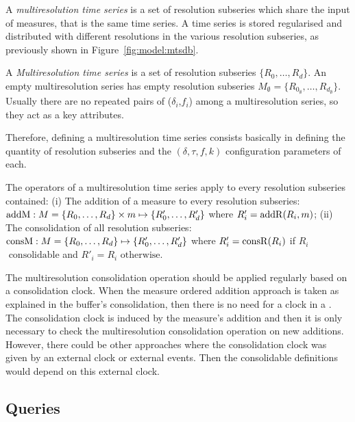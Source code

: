 A \emph{multiresolution time series} is a set of resolution subseries
which share the input of measures, that is the same time series. A
time series is stored regularised and distributed with different
resolutions in the various resolution subseries, as previously shown
in Figure~\ref{fig:model:mtsdb}.
\begin{definition}%
  A \emph{Mul\-ti\-re\-solution time series} is a set of resolution
  subseries $\{R_0, \dots, R_d\}$.  An empty multiresolution series
  has empty resolution subseries $M_{\emptyset}=\{R_{0_\emptyset},
  \dots, R_{d_\emptyset}\}$. Usually there are no repeated pairs of
  ($\delta_i$,$f_i$) among a multiresolution series, so they act as a
  key attributes.
\end{definition}

Therefore, defining a multiresolution time series consists basically
in defining the quantity of resolution subseries and the
$(\delta,\tau,f,k)$ configuration parameters of each.


The operators of a multiresolution time series apply to every
resolution subseries contained: (i) The addition of a measure to every
resolution subseries: $\operatorname{addM} : M=\{R_0,\allowbreak \dots,\allowbreak
R_d\} \times m \mapsto \{R'_0, \dots,\allowbreak R'_d\}$ where
$R'_i=\operatorname{addR}(R_i,m)$; (ii) The consolidation of all resolution
subseries: $\operatorname{consM} : M=\{R_0,\allowbreak \dots,\allowbreak R_d\}
\mapsto \{R'_0,\allowbreak \dots,\allowbreak R'_d\}$ where $R'_i =
\operatorname{consR}(R_i)$ if $R_i$ $\text{ consolidable}$ and $R'_i=R_i$
$\text{otherwise}$.


The multiresolution consolidation operation should be applied
regularly based on a consolidation clock. When the measure ordered
addition approach is taken as explained in the buffer's consolidation,
then there is no need for a clock in a . The consolidation clock
is induced by the measure's addition and then it is only necessary to
check the multiresolution consolidation operation on new
additions. However, there could be other approaches where the
consolidation clock was given by an external clock or external
events. Then the consolidable definitions would depend on this
external clock.





\subsection{Queries}


